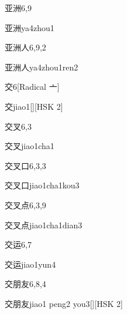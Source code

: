 \begin{entry}{亚洲}{6,9}
  \begin{phonetics}{亚洲}{ya4zhou1}
  \end{phonetics}
\end{entry}

\begin{entry}{亚洲人}{6,9,2}
  \begin{phonetics}{亚洲人}{ya4zhou1ren2}
  \end{phonetics}
\end{entry}

\begin{entry}{交}{6}[Radical 亠]
  \begin{phonetics}{交}{jiao1}[][HSK 2]
  \end{phonetics}
\end{entry}

\begin{entry}{交叉}{6,3}
  \begin{phonetics}{交叉}{jiao1cha1}
  \end{phonetics}
\end{entry}

\begin{entry}{交叉口}{6,3,3}
  \begin{phonetics}{交叉口}{jiao1cha1kou3}
  \end{phonetics}
\end{entry}

\begin{entry}{交叉点}{6,3,9}
  \begin{phonetics}{交叉点}{jiao1cha1dian3}
  \end{phonetics}
\end{entry}

\begin{entry}{交运}{6,7}
  \begin{phonetics}{交运}{jiao1yun4}
  \end{phonetics}
\end{entry}

\begin{entry}{交朋友}{6,8,4}
  \begin{phonetics}{交朋友}{jiao1 peng2 you3}[][HSK 2]
  \end{phonetics}
\end{entry}

